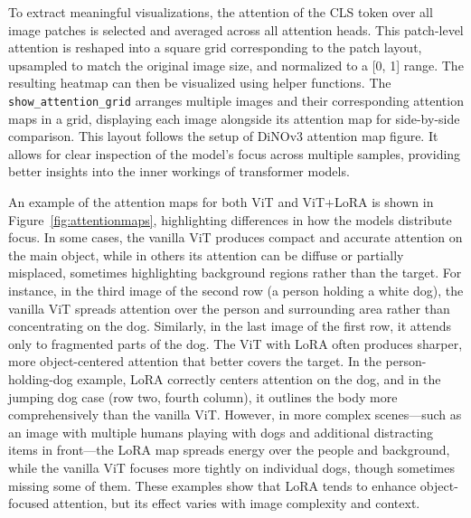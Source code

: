\documentclass[10pt]{article}
\begin{document}
To extract meaningful visualizations, the attention of the CLS token over all image patches is selected and averaged across all attention heads. This patch-level attention is reshaped into a square grid corresponding to the patch layout, upsampled to match the original image size, and normalized to a [0, 1] range. The resulting heatmap can then be visualized using helper functions. The \texttt{show\_attention\_grid} arranges multiple images and their corresponding attention maps in a grid, displaying each image alongside its attention map for side-by-side comparison. This layout follows the setup of DiNOv3 attention map figure. It allows for clear inspection of the model's focus across multiple samples, providing better insights into the inner workings of transformer models.

An example of the attention maps for both ViT and ViT+LoRA is shown in Figure~\ref{fig:attentionmaps}, highlighting differences in how the models distribute focus. In some cases, the vanilla ViT produces compact and accurate attention on the main object, while in others its attention can be diffuse or partially misplaced, sometimes highlighting background regions rather than the target. For instance, in the third image of the second row (a person holding a white dog), the vanilla ViT spreads attention over the person and surrounding area rather than concentrating on the dog. Similarly, in the last image of the first row, it attends only to fragmented parts of the dog. The ViT with LoRA often produces sharper, more object-centered attention that better covers the target. In the person-holding-dog example, LoRA correctly centers attention on the dog, and in the jumping dog case (row two, fourth column), it outlines the body more comprehensively than the vanilla ViT. However, in more complex scenes—such as an image with multiple humans playing with dogs and additional distracting items in front—the LoRA map spreads energy over the people and background, while the vanilla ViT focuses more tightly on individual dogs, though sometimes missing some of them. These examples show that LoRA tends to enhance object-focused attention, but its effect varies with image complexity and context.
\end{document}
